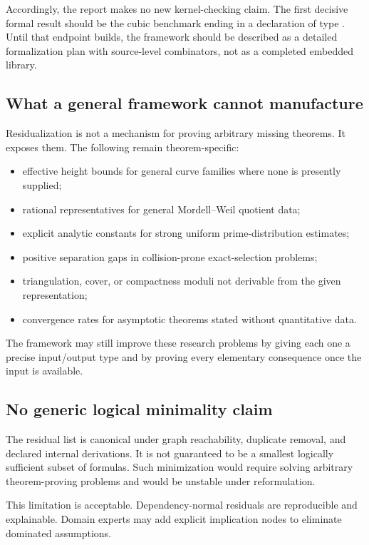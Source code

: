 Accordingly, the report makes no new kernel-checking claim.  The first decisive formal result should be the cubic benchmark ending in a declaration of type .  Until that endpoint builds, the framework should be described as a detailed formalization plan with source-level combinators, not as a completed embedded library.

\subsection{What a general framework cannot manufacture}

Residualization is not a mechanism for proving arbitrary missing theorems.  It exposes them.  The following remain theorem-specific:

\begin{itemize}
\item effective height bounds for general curve families where none is presently supplied;
\item rational representatives for general Mordell--Weil quotient data;
\item explicit analytic constants for strong uniform prime-distribution estimates;
\item positive separation gaps in collision-prone exact-selection problems;
\item triangulation, cover, or compactness moduli not derivable from the given representation;
\item convergence rates for asymptotic theorems stated without quantitative data.
\end{itemize}

The framework may still improve these research problems by giving each one a precise input/output type and by proving every elementary consequence once the input is available.

\subsection{No generic logical minimality claim}

The residual list is canonical under graph reachability, duplicate removal, and declared internal derivations.  It is not guaranteed to be a smallest logically sufficient subset of formulas.  Such minimization would require solving arbitrary theorem-proving problems and would be unstable under reformulation.

This limitation is acceptable.  Dependency-normal residuals are reproducible and explainable.  Domain experts may add explicit implication nodes to eliminate dominated assumptions.

